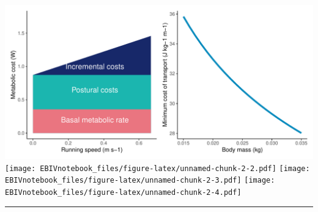 \documentclass[
]{article}
\begin{document}
\includegraphics{EBIVnotebook_files/figure-latex/unnamed-chunk-2-1.pdf}
\texttt{[image: EBIVnotebook\_files/figure-latex/unnamed-chunk-2-2.pdf]}
\texttt{[image: EBIVnotebook\_files/figure-latex/unnamed-chunk-2-3.pdf]}
\texttt{[image: EBIVnotebook\_files/figure-latex/unnamed-chunk-2-4.pdf]}

\begin{center}\rule{0.5\linewidth}{0.5pt}\end{center}
\end{document}
